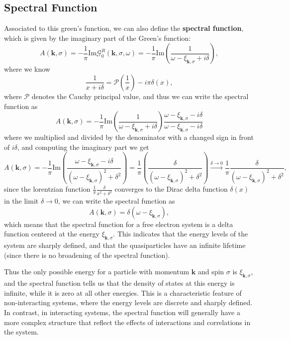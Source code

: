 \subsection{Spectral Function}
Associated to this green's function, we can also define the \textbf{spectral function}, which is given by the imaginary part of the Green's function:
\[
    A (\mathbf{k}, \sigma) = -\frac{1}{\pi} \mathrm{Im} \mathcal{G}_0^R(\mathbf{k}, \sigma, \omega) = - \frac{1}{\pi} \mathrm{Im} \left( \frac{1}{\omega - \xi_{\mathbf{k}, \sigma} + i \delta} \right),
\]
where we know
\[
    \frac{1}{x + i \delta} = \mathcal{P} \left( \frac{1}{x} \right) - i \pi \delta(x),
\]
where \(\mathcal{P}\) denotes the Cauchy principal value, and thus we can write the spectral function as
\[
    A (\mathbf{k}, \sigma) = - \frac{1}{\pi} \mathrm{Im} \left( \frac{1}{\omega - \xi_{\mathbf{k}, \sigma} + i \delta} \right) \frac{\omega - \xi_{\mathbf{k}, \sigma} - i \delta}{\omega - \xi_{\mathbf{k}, \sigma} - i \delta}
\]
where we multiplied and divided by the denominator with a changed sign in front of \(i \delta\), and computing the imaginary part we get
\[
    A(\mathbf{k}, \sigma) = - \frac{1}{\pi} \mathrm{Im} \left( \frac{\omega - \xi_{\mathbf{k}, \sigma} - i \delta}{(\omega - \xi_{\mathbf{k}, \sigma})^2 + \delta^2} \right) = \frac{1}{\pi} \left( \frac{\delta}{(\omega - \xi_{\mathbf{k}, \sigma})^2 + \delta^2} \right) \xrightarrow{\delta \to  0} \frac{1}{\pi} \frac{\delta}{(\omega - \xi_{\mathbf{k}, \sigma})^2 + \delta^2},
\]
since the lorentzian function \(\frac{1}{\pi} \frac{\delta}{x^2 + \delta^2}\) converges to the Dirac delta function \(\delta(x)\) in the limit \(\delta \to 0\), we can write the spectral function as
\[
    A(\mathbf{k}, \sigma) = \delta(\omega - \xi_{\mathbf{k}, \sigma}),
\]
which means that the spectral function for a free electron system is a delta function centered at the energy \(\xi_{\mathbf{k}, \sigma}\). This indicates that the energy levels of the system are sharply defined, and that the quasiparticles have an infinite lifetime (since there is no broadening of the spectral function).

Thus the only possible energy for a particle with momentum \(\mathbf{k}\) and spin \(\sigma\) is \(\xi_{\mathbf{k}, \sigma}\), and the spectral function tells us that the density of states at this energy is infinite, while it is zero at all other energies. This is a characteristic feature of non-interacting systems, where the energy levels are discrete and sharply defined. In contrast, in interacting systems, the spectral function will generally have a more complex structure that reflect the effects of interactions and correlations in the system.

